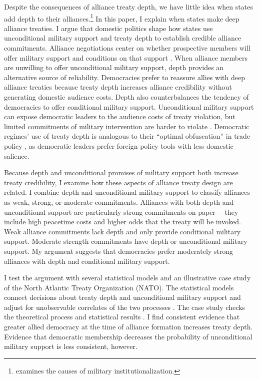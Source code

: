 \documentclass[12pt]{article}
\begin{document}
Despite the consequences of alliance treaty depth, we have little idea when states add depth to their alliances.\footnote{\citet{Mattes2012} examines the causes of military institutionalization.}
In this paper, I explain when states make deep alliance treaties.
I argue that domestic politics shape how states use unconditional military support and treaty depth to establish credible alliance commitments. 
Alliance negotiations center on whether prospective members will offer military support and conditions on that support \citep{Poast2019a}. 
When alliance members are unwilling to offer unconditional military support, depth provides an alternative source of reliability.
Democracies prefer to reassure allies with deep alliance treaties because treaty depth increases alliance credibility without generating domestic audience costs.
Depth also counterbalances the tendency of democracies to offer conditional military support. 
Unconditional military support can expose democratic leaders to the audience costs of treaty violation, but limited commitments of military intervention are harder to violate \citep{Mattes2012, Chibaetal2015}.
Democratic regimes' use of treaty depth is analogous to their ``optimal obfuscation'' in trade policy \citep{Kono2006}, as democratic leaders prefer foreign policy tools with less domestic salience.  


Because depth and unconditional promises of military support both increase treaty credibility, I examine how these aspects of alliance treaty design are related. 
I combine depth and unconditional military support to classify alliances as weak, strong, or moderate commitments. 
Alliances with both depth and unconditional support are particularly strong commitments on paper--- they include high peacetime costs and higher odds that the treaty will be invoked. 
Weak alliance commitments lack depth and only provide conditional military support. 
Moderate strength commitments have depth or unconditional military support. 
My argument suggests that democracies prefer moderately strong alliances with depth and conditional military support.  


I test the argument with several statistical models and an illustrative case study of the North Atlantic Treaty Organization (NATO).
The statistical models connect decisions about treaty depth and unconditional military support and adjust for unobservable correlates of the two processes \citep{Braumoelleretal2018}. 
The case study checks the theoretical process and statistical results \citep{SeawrightGerring2008, Seawright2016}. 
I find consistent evidence that greater allied democracy at the time of alliance formation increases treaty depth.
Evidence that democratic membership decreases the probability of unconditional military support is less consistent, however. 
\end{document}
